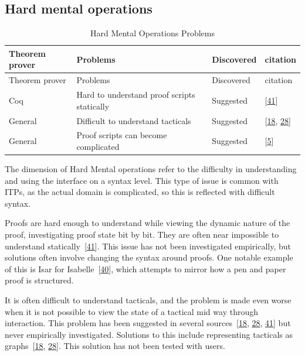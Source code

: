 \documentclass[
]{article}
\begin{document}
\hypertarget{hard-mental-operations-1}{%
\subsection{Hard mental operations}\label{hard-mental-operations-1}}

\hypertarget{tbl:hard_mental_operations}{}
\begin{longtable}[]{@{}llll@{}}
\caption{\label{tbl:hard_mental_operations}Hard Mental Operations
Problems}\tabularnewline
\toprule
Theorem prover & Problems & Discovered & citation \\
\midrule
\endfirsthead
\toprule
Theorem prover & Problems & Discovered & citation \\
\midrule
\endhead
Coq & Hard to understand proof scripts statically & Suggested &
{[}\protect\hyperlink{ref-zacchiroli_user_2007}{41}{]} \\
General & Difficult to understand tacticals & Suggested &
{[}\protect\hyperlink{ref-grov_tinker_2018}{18},
\protect\hyperlink{ref-lin_understanding_2016}{28}{]} \\
General & Proof scripts can become complicated & Suggested &
{[}\protect\hyperlink{ref-aspinall_towards_2016}{5}{]} \\
\bottomrule
\end{longtable}

The dimension of Hard Mental operations refer to the difficulty in
understanding and using the interface on a syntax level. This type of
issue is common with ITPs, as the actual domain is complicated, so this
is reflected with difficult syntax.

Proofs are hard enough to understand while viewing the dynamic nature of
the proof, investigating proof state bit by bit. They are often near
impossible to understand
statically~{[}\protect\hyperlink{ref-zacchiroli_user_2007}{41}{]}. This
issue has not been investigated empirically, but solutions often involve
changing the syntax around proofs. One notable example of this is Isar
for Isabelle~{[}\protect\hyperlink{ref-wenzel_structured_2006}{40}{]},
which attempts to mirror how a pen and paper proof is structured.

It is often difficult to understand tacticals, and the problem is made
even worse when it is not possible to view the state of a tactical mid
way through interaction. This problem has been suggested in several
sources~{[}\protect\hyperlink{ref-grov_tinker_2018}{18},
\protect\hyperlink{ref-lin_understanding_2016}{28},
\protect\hyperlink{ref-zacchiroli_user_2007}{41}{]} but never
empirically investigated. Solutions to this include representing
tacticals as graphs~{[}\protect\hyperlink{ref-grov_tinker_2018}{18},
\protect\hyperlink{ref-lin_understanding_2016}{28}{]}. This solution has
not been tested with users.
\end{document}
